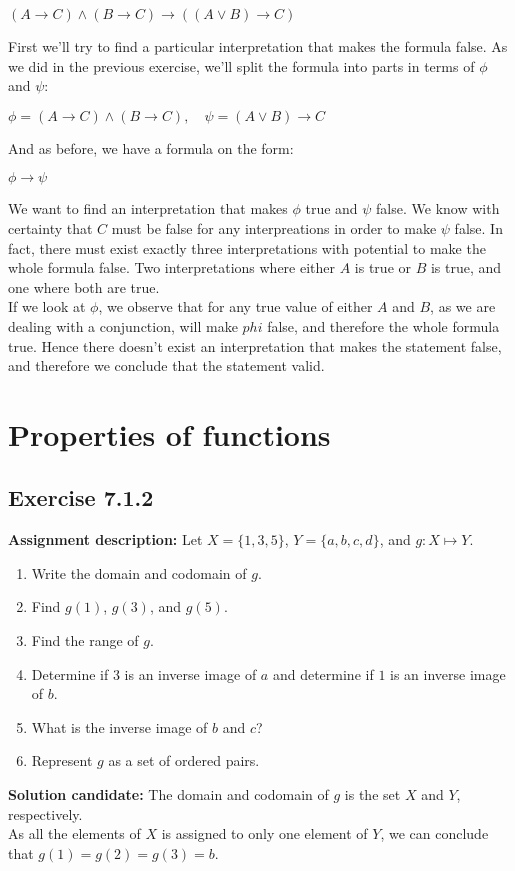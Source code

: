 \documentclass{report}
\newcommand{\cent}[1]{\begin{center}#1\end{center}}
\newcommand{\AssignmentDescription}{\textbf{Assignment description: }}
\newcommand{\Solution}{\textbf{Solution candidate: }}
\newcommand{\Section}[1]{\section{#1}}
\newcommand{\Exercise}[1]{\subsection{Exercise #1}}
\newcommand{\defaultEnumerateLabel}{\textbf{\alph*.}}
\begin{document}
\begin{enumerate}
 		\cent{$(A \to C) \wedge (B \to C) \to ((A \vee B) \to C)$}
 		
 		First we'll try to find a particular interpretation that makes the formula false. As we did in the previous exercise, we'll split the formula into parts in terms of $\phi$ and $\psi$:
 		
 		\cent{$\phi = (A \to C) \wedge (B \to C), \quad \psi = (A \vee B) \to C $}
 		
 		And as before, we have a formula on the form:
 		
 		\cent{$\phi \to \psi$}
 		
 		We want to find an interpretation that makes $\phi$ true and $\psi$ false. We know with certainty that $C$ must be false for any interpreations in order to make $\psi$ false. In fact, there must exist exactly three interpretations with potential to make the whole formula false. Two interpretations where either $A$ is true or $B$ is true, and one where both are true.\\
 		
 		If we look at $\phi$, we observe that for any true value of either $A$ and $B$, as we are dealing with a conjunction, will make $phi$ false, and therefore the whole formula true. Hence there doesn't exist an interpretation that makes the statement false, and therefore we conclude that the statement valid.
 	\end{enumerate}
 \Section{Properties of functions}
 	\Exercise{7.1.2}
 	
 	\AssignmentDescription 
 	Let $X = \{1,3,5\}$, $Y = \{a,b,c,d\}$, and $g : X \mapsto Y$.
 	
 	\begin{enumerate}[label=\defaultEnumerateLabel]
 		\item Write the domain and codomain of $g$.
 		\item Find $g(1)$, $g(3)$, and $g(5)$.
 		\item Find the range of $g$.
 		\item Determine if 3 is an inverse image of $a$ and determine if $1$ is an inverse image of $b$.
 		\item What is the inverse image of $b$ and $c$?
 		\item Represent $g$ as a set of ordered pairs.
 	\end{enumerate}
 
 	\Solution
 	The domain and codomain of $g$ is the set $X$ and $Y$, respectively.\\
 	
 	As all the elements of $X$ is assigned to only one element of $Y$, we can conclude that $g(1) = g(2) = g(3) = b$.\\
 	
\end{document}
